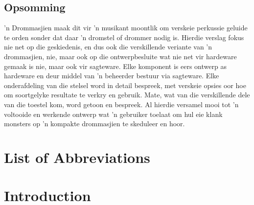 \documentclass[12pt,a4paper]{report}
\begin{document}
\section*{Opsomming}
'n Drommasjien maak dit vir 'n musikant moontlik om verskeie perkussie geluide te orden sonder dat daar 'n dromstel of drommer nodig is. Hierdie verslag fokus nie net op die geskiedenis, en dus ook die verskillende veriante van 'n drommasjien, nie, maar ook op die ontwerpbesluite wat nie net vir hardeware gemaak is nie, maar ook vir sagteware. Elke komponent is eers ontwerp as hardeware en deur middel van 'n beheerder bestuur via sagteware. Elke onderafdeling van die stelsel word in detail bespreek, met verskeie opsies oor hoe om soortgelyke resultate te verkry en gebruik. Mate, wat van die verskillende dele van die toestel kom, word getoon en bespreek. Al hierdie versamel mooi tot 'n voltooide en werkende ontwerp wat 'n gebruiker toelaat om hul eie klank monsters op 'n kompakte drommasjien te skeduleer en hoor.
\newpage

\tableofcontents
\listoffigures
\listoftables
\lstlistoflistings
\newpage
\chapter*{List of Abbreviations}
\begin{multicols}{2}
	\printacronyms[name={List of Abbreviations}, heading=none]
\end{multicols}

\newpage

\chapter{Introduction}
\end{document}
